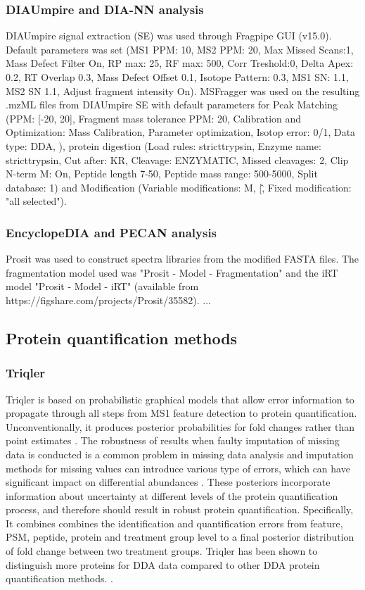 \documentclass[10pt,letterpaper]{article}
\begin{document}
\subsubsection*{DIAUmpire and DIA-NN analysis}
DIAUmpire signal extraction (SE) was used through Fragpipe GUI (v15.0). Default parameters was set (MS1 PPM: 10, MS2 PPM: 20, Max Missed Scans:1, Mass Defect Filter On, RP max: 25, RF max: 500, Corr Treshold:0, Delta Apex: 0.2, RT Overlap 0.3, Mass Defect Offset 0.1, Isotope Pattern: 0.3, MS1 SN: 1.1, MS2 SN 1.1, Adjust fragment intensity On). MSFragger was used on the resulting .mzML files from DIAUmpire SE with default parameters for Peak Matching (PPM: [-20, 20], Fragment mass tolerance PPM: 20, Calibration and Optimization: Mass Calibration, Parameter optimization, Isotop error: 0/1, Data type: DDA, ), protein digestion (Load rules: stricttrypsin, Enzyme name: stricttrypsin, Cut after: KR, Cleavage: ENZYMATIC, Missed cleavages: 2, Clip N-term M: On, Peptide length 7-50, Peptide mass range: 500-5000, Split database: 1) and Modification (Variable modifications: M, \/[\^, Fixed modification: "all selected"). 

\subsubsection*{EncyclopeDIA and PECAN analysis}
Prosit was used to construct spectra libraries from the modified FASTA files. The fragmentation model used was "Prosit - Model - Fragmentation" and the iRT model "Prosit - Model - iRT" (available from https://figshare.com/projects/Prosit/35582).
...

\subsection*{Protein quantification methods}

\subsubsection*{Triqler}

Triqler is based on probabilistic graphical models that allow error information to propagate through all steps from MS1 feature detection to protein quantification. Unconventionally, it produces posterior probabilities for fold changes rather than point estimates \cite{The2018Integrated}. The robustness of results when faulty imputation of missing data is conducted is a common problem in missing data analysis \cite{ma2018bayesian} and imputation methods for missing values can introduce various type of errors, which can have significant impact on differential abundances \cite{webb2015review} \cite{lazar2016accounting}. These posteriors incorporate information about uncertainty at different levels of the protein quantification process, and therefore should result in robust protein quantification. Specifically, It combines combines the identification and quantification errors from feature, PSM, peptide, protein and treatment group level to a final posterior distribution of fold change between two treatment groups. Triqler has been shown to distinguish more proteins for DDA data compared to other DDA protein quantification methods. \cite{The2018Integrated}. 
\end{document}
